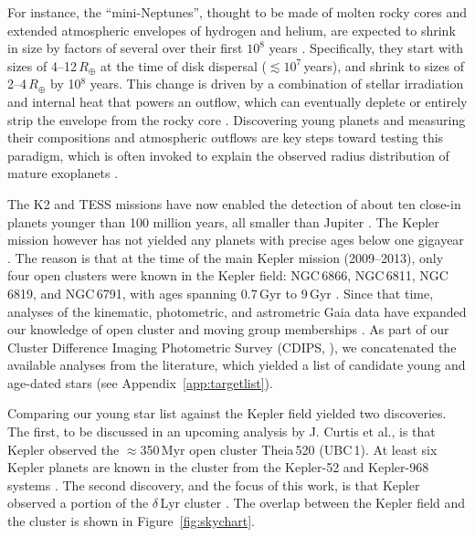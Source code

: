 \documentclass[12pt,modern,twocolumn,tighten]{aastex63}
\begin{document}
For instance, the ``mini-Neptunes'', thought to be made of
molten rocky cores \citep{kite_atmosphere_2020} and extended atmospheric envelopes of hydrogen and
helium, are expected to shrink in size by factors of several over
their first $10^8$ years
\citep{owen_constraining_2020}.  Specifically,
they start with sizes of 4--12\,$R_\oplus$ at the time of disk
dispersal ($\lesssim$$10^7$\,years), and shrink to sizes of
2--4\,$R_\oplus$ by 10$^8$ years.  This change is driven by a
combination of stellar irradiation and internal heat that powers an
outflow, which can eventually deplete or entirely strip the envelope
from the rocky core \citep{Owen_Wu_2013,ginzburg_corepowered_2018}.
Discovering young planets and measuring their compositions and
atmospheric outflows are key steps toward testing this paradigm, which
is often invoked to explain the observed radius distribution of mature
exoplanets \citep{Fulton_et_al_2017}.

The K2 and TESS missions have now enabled the detection of about ten
close-in planets younger than 100 million years, all smaller than
Jupiter
\citep{Mann_K2_33b_2016,David_et_al_2017,david_four_2019,newton_tess_2019,bouma_cluster_2020,plavchan_planet_2020,rizzuto_tess_2020}.
The Kepler mission however has not yielded any planets with precise
ages below one gigayear \citep{Meibom_et_al_2013}.  The reason is that
at the time of the main Kepler mission (2009--2013), only four open
clusters were known in the Kepler field: NGC\,6866, NGC\,6811,
NGC\,6819, and NGC\,6791, with ages spanning 0.7\,Gyr to 9\,Gyr
\citep{meibom_kepler_2011}.  Since that time, analyses of the
kinematic, photometric, and astrometric Gaia data have expanded our
knowledge of open cluster and moving group memberships \citep[{\it
e.g.},][]{cantatgaudin_gaia_2018,zari_3d_2018,kounkel_untangling_2019,Meingast2021,kerr_stars_2021}.
As part of our Cluster Difference Imaging Photometric Survey (CDIPS,
\citealt{bouma_cdipsI_2019}), we concatenated the available analyses
from the literature, which yielded a list of candidate young and
age-dated stars (see Appendix~\ref{app:targetlist}).

Comparing our young star list against the Kepler field yielded two
discoveries.  The first, to be discussed in an upcoming analysis by J.
Curtis et al{.}, is that Kepler observed the $\approx$350\,Myr open
cluster Theia\,520 (UBC\,1).  At least six Kepler planets are known in
the cluster from the Kepler-52 and Kepler-968 systems
\citep{rowe_validation_2014,jontof-hutter_following_2021}.  The second
discovery, and the focus of this work, is that Kepler observed a
portion of the $\delta$\,Lyr cluster \citep[Stephenson-1;][]{stephenson_possible_1959,eggen_photometric_1968}.
The overlap between the Kepler field and the cluster is shown in
Figure~\ref{fig:skychart}.
\end{document}
